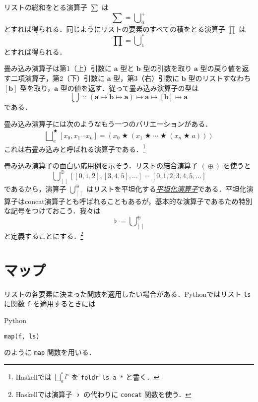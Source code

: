 \documentclass[a4paper,draft]{jsbook}
\newcommand{\programminglanguage}[1]{\textsf{#1}}
\newcommand{\haskell}{\programminglanguage{Haskell}}
\newcommand{\python}{\programminglanguage{Python}}
\newcommand{\keyword}[1]{{\underline{\emph{#1}}}}
\newcommand{\code}[1]{\texttt{#1}}
\newenvironment{pythoncode}{\begin{itembox}[r]{\python}}{\end{itembox}}
\newcommand{\mType}[1]{\mathbf{#1}}
\newcommand{\mListType}[1]{[\mType{#1}]}
\newcommand{\mEmptyList}{{[\,]}}
\newcommand{\mListOf}[1]{\left[#1\right]}
\newcommand{\mListVar}[1]{{#1}^\mathrm{s}}
\DeclareMathOperator{\mIn}{{:\!:}}
\DeclareMathOperator{\mMapsTo}{\mapsto}
\DeclareMathOperator{\mBinOp}{\bigstar}
\DeclareMathOperator*{\mFoldLeft}{\bigcup}
\DeclareMathOperator*{\mFoldRight}{\bigsqcup}
\DeclareMathOperator{\mConcat}{\flat}
\DeclareMathOperator{\mAppend}{\oplus}
\newcommand{\mProjection}[2]{#1\mMapsTo#2}
\begin{document}
リストの総和をとる演算子 $\sum$ は
\begin{equation}
\sum=\mFoldLeft^+_0
\end{equation}
とすれば得られる．同じようにリストの要素のすべての積をとる演算子 $\prod$ は
\begin{equation}
\prod=\mFoldLeft^*_1
\end{equation}
とすれば得られる．

畳み込み演算子は第1（上）引数に $\mType{a}$ 型と $\mType{b}$ 型の引数を取り $\mType{a}$ 型の戻り値を返す二項演算子，第2（下）引数に $\mType{a}$ 型，第3（右）引数に $\mType{b}$ 型のリストすなわち $\mListType{b}$ 型を取り，$\mType{a}$ 型の値を返す．従って畳み込み演算子の型は
\begin{equation}
\mFoldLeft
\mIn{}
\mProjection{(\mProjection{\mType{a}}{\mProjection{\mType{b}}{\mType{a}}})}
{\mProjection{\mType{a}}{\mProjection{\mListType{b}}{\mType{a}}}}
\end{equation}
である．

畳み込み演算子には次のようなもう一つのバリエーションがある．
\begin{equation}
\mFoldRight^{\mBinOp}_{a}\mListOf{x_0,x_1\dotsb x_n}
=(x_0\mBinOp(x_1\mBinOp\dotsb\mBinOp(x_n\mBinOp a)))
\end{equation}
これは右畳み込みと呼ばれる演算子である．\footnote{\haskell では $\mFoldRight^{*}_a\mListVar{l}$ を \code{foldr ls a *} と書く．}

畳み込み演算子の面白い応用例を示そう．リストの結合演算子 $(\mAppend)$ を使うと
\begin{equation}
\mFoldLeft_{\mEmptyList}^{\mAppend}\mListOf{\mListOf{0,1,2},\mListOf{3,4,5},\dots}=\mListOf{0,1,2,3,4,5,\dots}
\end{equation}
であるから，演算子 $\mFoldLeft_{\mEmptyList}^{\mAppend}$ はリストを平坦化する\keyword{平坦化演算子}である．平坦化演算子はconcat演算子とも呼ばれることもあるが，基本的な演算子であるため特別な記号をつけておこう．我々は
\begin{equation}
\mConcat=\mFoldLeft_{\mEmptyList}^{\mAppend}
\end{equation}
と定義することにする．\footnote{\haskell では演算子 $\mConcat$ の代わりに \code{concat} 関数を使う．}

\section{マップ}

リストの各要素に決まった関数を適用したい場合がある．\python ではリスト \code{ls} に関数 \code{f} を適用するときには
\begin{pythoncode}
\begin{verbatim}
map(f, ls)
\end{verbatim}
\end{pythoncode}
のように \code{map} 関数を用いる．
\end{document}
